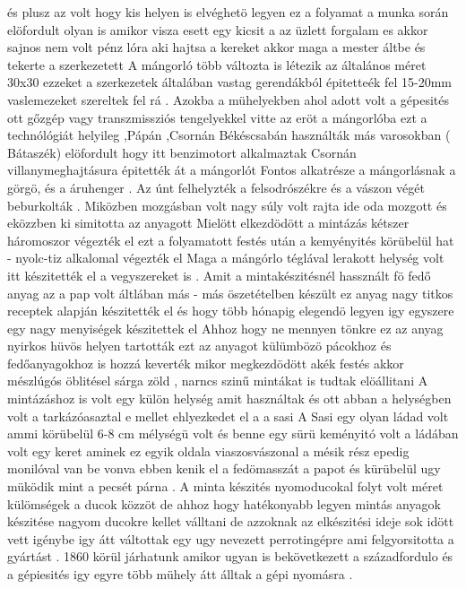 \documentclass[fontsize=12pt, appendixprefix=true]{scrreprt}
\begin{document}
 és plusz az volt hogy kis helyen is elvéghetö legyen ez a folyamat a munka során 
 elöfordult olyan is amikor visza esett egy kicsit a az üzlett forgalam es akkor sajnos nem volt pénz lóra aki hajtsa a kereket akkor maga a mester áltbe és tekerte a szerkezetett
 A mángorló több változta is létezik az általános méret 30x30  ezzeket a szerkezetek általában vastag gerendákból épitetteék fel 15-20mm vaslemezeket szereltek fel rá .
 Azokba a mühelyekben ahol adott volt a gépesités ott gőzgép vagy transzmissziós tengelyekkel vitte az eröt a mángorlóba ezt a technólógiát helyileg ,Pápán ,Csornán Békéscsabán használták 
 más varosokban ( Bátaszék) elöfordult  hogy itt benzimotort alkalmaztak Csornán villanymeghajtásura épitették át a mángorlót 
 Fontos alkatrésze a mángorlásnak a görgö, és a áruhenger .
 Az únt felhelyzték a felsodrószékre  és a vászon végét beburkolták .
 Miközben mozgásban volt nagy súly volt rajta ide oda mozgott és eközzben ki simitotta az anyagott 
 Mielött elkezdödött a mintázás kétszer háromoszor végezték el ezt a folyamatott festés után a kemyényités körübelül hat - nyolc-tiz alkalomal végezték el 
 Maga a mángórlo téglával lerakott helység volt itt készitették el a vegyszereket is .
 Amit a mintakészitésnél hassznált fö fedő anyag az a pap volt áltlában más - más öszetételben készült ez anyag nagy titkos receptek alapján készitették el 
 és hogy több hónapig elegendö legyen igy egyszere egy nagy menyiségek készitettek el 
 Ahhoz hogy ne mennyen tönkre ez az anyag nyirkos hüvös helyen tartották 
 ezt az anyagot külümbözö pácokhoz és fedőanyagokhoz is hozzá keverték mikor megkezdödött akék festés akkor mészlúgós öblitésel sárga zöld , narncs szinű mintákat is tudtak elöállitani
 A mintázáshoz is volt egy külön helység amit használtak és ott abban a helységben volt a tarkázóasaztal e mellet ehlyezkedet el a a sasi 
 A Sasi egy olyan ládad volt ammi körübelül 6-8 cm mélységü volt és benne  egy sürü keményitó volt
 a ládában volt egy keret aminek ez egyik oldala viaszosvászonal a mésik rész epedig monilóval van be vonva ebben kenik el a fedömasszát a papot  és kürübelül ugy müködik mint a pecsét párna .
 A minta készités nyomoducokal folyt volt méret külömségek a ducok közzöt de ahhoz hogy hatékonyabb legyen  mintás anyagok készitése nagyom ducokre kellet válltani de azzoknak az elkészitési ideje sok idött vett  igénybe igy átt váltottak egy  ugy nevezett perrotingépre ami felgyorsitotta a gyártást .
 1860 körül járhatunk amikor  ugyan is bekövetkezett a századfordulo és a gépiesités igy egyre több mühely átt álltak a gépi nyomásra .
\end{document}
